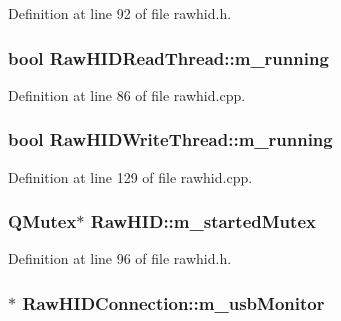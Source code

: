 Definition at line 92 of file rawhid.\-h.

\hypertarget{group___raw_h_i_d_plugin_ga0b977a016ba6a452e9bdf1d49e2d89e3}{
\subsubsection[{m\-\_\-running}]{\setlength{\rightskip}{0pt plus 5cm}bool Raw\-H\-I\-D\-Read\-Thread\-::m\-\_\-running\hspace{0.3cm}{\ttfamily [protected]}}}\label{group___raw_h_i_d_plugin_ga0b977a016ba6a452e9bdf1d49e2d89e3}


Definition at line 86 of file rawhid.\-cpp.

\hypertarget{group___raw_h_i_d_plugin_gaf4f4725b8f0b6ed4b9b5c751397d0abe}{
\subsubsection[{m\-\_\-running}]{\setlength{\rightskip}{0pt plus 5cm}bool Raw\-H\-I\-D\-Write\-Thread\-::m\-\_\-running\hspace{0.3cm}{\ttfamily [protected]}}}\label{group___raw_h_i_d_plugin_gaf4f4725b8f0b6ed4b9b5c751397d0abe}


Definition at line 129 of file rawhid.\-cpp.

\hypertarget{group___raw_h_i_d_plugin_ga62ee841aa1de86d73cfd1b9bc7a5d719}{
\subsubsection[{m\-\_\-started\-Mutex}]{\setlength{\rightskip}{0pt plus 5cm}Q\-Mutex$\ast$ Raw\-H\-I\-D\-::m\-\_\-started\-Mutex\hspace{0.3cm}{\ttfamily [protected]}}}\label{group___raw_h_i_d_plugin_ga62ee841aa1de86d73cfd1b9bc7a5d719}


Definition at line 96 of file rawhid.\-h.

\hypertarget{group___raw_h_i_d_plugin_ga03aaa7c95bd19c0d373b3c2b4e982cdb}{
\subsubsection[{m\-\_\-usb\-Monitor}]{$\ast$ Raw\-H\-I\-D\-Connection\-::m\-\_\-usb\-Monitor\hspace{0.3cm}{\ttfamily [protected]}}}\label{group___raw_h_i_d_plugin_ga03aaa7c95bd19c0d373b3c2b4e982cdb}


